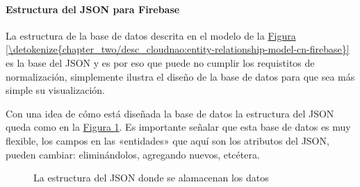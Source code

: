 \paragraph{Estructura del JSON para Firebase}
\label{\detokenize{chapter_two/desc_cloudnao:estructura-del-json-para-firebase}}
La estructura de la base de datos descrita en el modelo de la \hyperref[\detokenize{chapter_two/desc_cloudnao:entity-relationship-model-cn-firebase}]{Figura \ref{\detokenize{chapter_two/desc_cloudnao:entity-relationship-model-cn-firebase}}}
es la base del JSON y es por eso que puede no cumplir los requistitos de normalización,
simplemente ilustra el diseño de la base de datos para que sea más simple su
visualización.

Con una idea de cómo está diseñada la base de datos la estructura del JSON
queda como en la \hyperref[\detokenize{chapter_two/desc_cloudnao:json-structure}]{Figura \ref{\detokenize{chapter_two/desc_cloudnao:json-structure}}}. Es importante señalar que esta base de datos
es muy flexible, los campos en las «entidades» que aquí son los atributos
del JSON, pueden cambiar: eliminándolos, agregando nuevos, etcétera.

\begin{figure}[htbp]
\centering
\capstart

\noindent{}
\caption{La estructura del JSON donde se alamacenan los datos}\label{\detokenize{chapter_two/desc_cloudnao:json-structure}}\end{figure}

